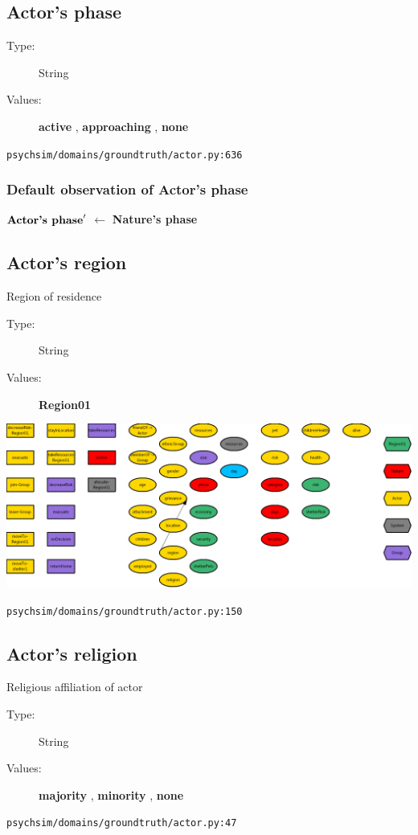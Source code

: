 \documentclass{article}%
\begin{document}
%
\subsection{Actor's phase}%
\label{subsec:Actor's phase}%
\begin{description}%
\item[Type:]%
String%
\item[Values:]%
\textbf{active}%
, %
\textbf{approaching}%
, %
\textbf{none}%
\end{description}%
\begin{flushleft}%
\verb|psychsim/domains/groundtruth/actor.py:636|%
\end{flushleft}%
\subsubsection{Default observation of Actor's phase}%
\label{ssubsec:Default observation of Actor's phase}%
\begin{flushleft}%
$\mbox{\textbf{Actor's phase}} '$%
$\leftarrow$%
\textbf{Nature's phase}%
\end{flushleft}

%
\subsection{Actor's region}%
\label{subsec:Actor's region}%
Region of residence%
\begin{description}%
\item[Type:]%
String%
\item[Values:]%
\textbf{Region01}%
\end{description}%
\includegraphics[width=\textwidth]{images/regionOfActor.png}%
\begin{flushleft}%
\verb|psychsim/domains/groundtruth/actor.py:150|%
\end{flushleft}

%
\subsection{Actor's religion}%
\label{subsec:Actor's religion}%
Religious affiliation of actor%
\begin{description}%
\item[Type:]%
String%
\item[Values:]%
\textbf{majority}%
, %
\textbf{minority}%
, %
\textbf{none}%
\end{description}%
\begin{flushleft}%
\verb|psychsim/domains/groundtruth/actor.py:47|%
\end{flushleft}
\end{document}
